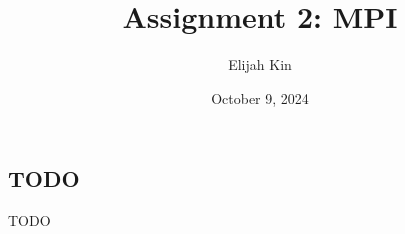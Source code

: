 \documentclass{article}
\title{Assignment 2: MPI}
\author{Elijah Kin}
\date{October 9, 2024}
\begin{document}
  \maketitle

  \subsection*{TODO}
  TODO
\end{document}
